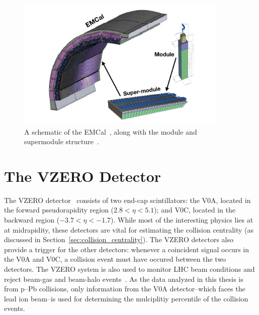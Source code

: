 \begin{figure}
    \centering
    \includegraphics[width=0.9\textwidth]{figures/experiment/emcal_schematic.png}
    \caption{A schematic of the EMCal~\cite{ERIN123}, along with the module and supermodule structure~\cite{ERIN124}.}
    \label{fig:emcal_schematic}
\end{figure}

\section{The VZERO Detector}

The VZERO detector~\cite{VZERO} consists of two end-cap scintillators: the V0A, located in the forward pseudorapidity region ($2.8 < \eta < 5.1$); and V0C, located in the backward region ($-3.7 < \eta < -1.7$). While most of the interesting physics lies at at midrapidity, these detectors are vital for estimating the collision centrality (as discussed in Section~\ref{sec:collision_centrality}). The VZERO detectors also provide a trigger for the other detectors: whenever a coincident signal occurs in the V0A and V0C, a collision event must have occured between the two detectors. The VZERO system is also used to monitor LHC beam conditions and reject beam-gas and beam-halo events~\cite{VZEROBing1, VZEROBing2}. As the data analyzed in this thesis is from p--Pb collisions, only information from the V0A detector--which faces the lead ion beam--is used for determining the mulciplitiy percentile of the collision events.
